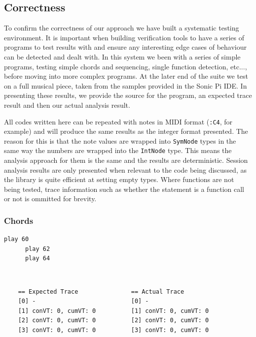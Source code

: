 \documentclass[11pt, abstracton, twoside, titlepage=true]{scrartcl}
\begin{document}
\subsection{Correctness}
To confirm the correctness of our approach we have built a systematic testing
environment. It is important when building verification tools to have a series
of programs to test results with and ensure any interesting edge cases of behaviour
can be detected and dealt with. In this system we been with a series of simple
programs, testing simple chords and sequencing, single function detection, etc...,
before moving into more complex programs. At the later end of the suite we test
on a full musical piece, taken from the samples provided in the Sonic Pi IDE. In
presenting these results, we provide the source for the program, an expected trace
result and then our actual analysis result.

All codes written here can be repeated with notes in MIDI format (\texttt{:C4}, 
for example) and will produce the same results as the integer format presented.
The reason for this is that the note values are wrapped into \texttt{SymNode} types 
in the same way the numbers are wrapped into the \texttt{IntNode} type. This means 
the analysis approach for them is the same and the results are deterministic.
Session analysis results are only presented when relevant to the code being
discussed, as the library is quite efficient at setting empty types. Where functions
are not being tested, trace information such as whether the statement is a function 
call or not is ommitted for brevity.

\subsubsection{Chords}

\begin{minipage}{\textwidth}
	\begin{lstlisting}[style = sonicpi]
      play 60
      play 62
      play 64
	\end{lstlisting}
\end{minipage}
\\
\begin{lstlisting}
    == Expected Trace               == Actual Trace
    [0] -                           [0] -
    [1] conVT: 0, cumVT: 0          [1] conVT: 0, cumVT: 0
    [2] conVT: 0, cumVT: 0          [2] conVT: 0, cumVT: 0
    [3] conVT: 0, cumVT: 0          [3] conVT: 0, cumVT: 0
\end{lstlisting}
\end{document}
